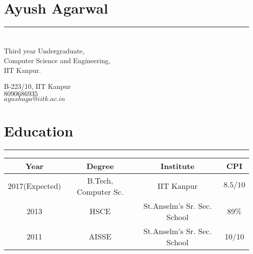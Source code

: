 \documentclass[a4paper]{article}
\author{Ayush Agarwal}
\begin{document}
\section*{\huge\textbf Ayush Agarwal}
\hrule
\section*{}
\begin{minipage}{.45\linewidth}
\begin{flushleft}
 Third year Undergraduate,\\
 Computer Science and Engineering,\\
 IIT Kanpur.
 \end{flushleft}
 \end{minipage}
 \hfill
 \begin{minipage}{.45\linewidth}
 \begin{flushright}
 B-223/10, IIT Kanpur\\
 $8090686935$\\
 $ayushaga@iitk.ac.in$\\
 \end{flushright}
 \end{minipage}
 \section*{Education}
 \hrule
 \begin{center}
 \vspace{2mm}
  \begin{tabular}{|c|c|c|c|}
  \hline
  Year & Degree & Institute & CPI\\
  \hline
  2017(Expected)& B.Tech, Computer Sc.&IIT Kanpur&$8.5/10$\\
  \hline
  2013& HSCE&St.Anselm's Sr. Sec. School&89\% \\
  \hline
  2011& AISSE&St.Anselm's Sr. Sec. School&10/10 \\
  \hline
  \end{tabular}
 \end{center} 
  
\end{document}
